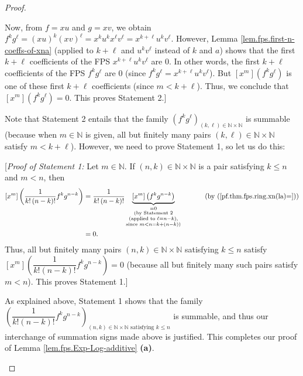 \begin{proof}
\begin{fineprint}
Now, from $f=xu$ and $g=xv$, we obtain $f^{k}g^{\ell}=\left(  xu\right)
^{k}\left(  xv\right)  ^{\ell}=x^{k}u^{k}x^{\ell}v^{\ell}=x^{k+\ell}%
u^{k}v^{\ell}$. However, Lemma \ref{lem.fps.first-n-coeffs-of-xna} (applied to
$k+\ell$ and $u^{k}v^{\ell}$ instead of $k$ and $a$) shows that the first
$k+\ell$ coefficients of the FPS $x^{k+\ell}u^{k}v^{\ell}$ are $0$. In other
words, the first $k+\ell$ coefficients of the FPS $f^{k}g^{\ell}$ are $0$
(since $f^{k}g^{\ell}=x^{k+\ell}u^{k}v^{\ell}$). But $\left[  x^{m}\right]
\left(  f^{k}g^{\ell}\right)  $ is one of these first $k+\ell$ coefficients
(since $m<k+\ell$). Thus, we conclude that $\left[  x^{m}\right]  \left(
f^{k}g^{\ell}\right)  =0$. This proves Statement 2.]

Note that Statement 2 entails that the family $\left(  f^{k}g^{\ell}\right)
_{\left(  k,\ell\right)  \in\mathbb{N}\times\mathbb{N}}$ is summable (because
when $m\in\mathbb{N}$ is given, all but finitely many pairs $\left(
k,\ell\right)  \in\mathbb{N}\times\mathbb{N}$ satisfy $m<k+\ell$). However, we
need to prove Statement 1, so let us do this:

[\textit{Proof of Statement 1:} Let $m\in\mathbb{N}$. If $\left(  n,k\right)
\in\mathbb{N}\times\mathbb{N}$ is a pair satisfying $k\leq n$ and $m<n$, then
\begin{align*}
\left[  x^{m}\right]  \left(  \dfrac{1}{k!\left(  n-k\right)  !}f^{k}%
g^{n-k}\right)   &  =\dfrac{1}{k!\left(  n-k\right)  !}\underbrace{\left[
x^{m}\right]  \left(  f^{k}g^{n-k}\right)  }_{\substack{=0\\\text{(by
Statement 2}\\\text{(applied to }\ell=n-k\text{),}\\\text{since }m<n=k+\left(
n-k\right)  \text{)}}}\ \ \ \ \ \ \ \ \ \ \left(  \text{by
(\ref{pf.thm.fps.ring.xn(la)=})}\right) \\
&  =0.
\end{align*}
Thus, all but finitely many pairs $\left(  n,k\right)  \in\mathbb{N}%
\times\mathbb{N}$ satisfying $k\leq n$ satisfy \newline$\left[  x^{m}\right]
\left(  \dfrac{1}{k!\left(  n-k\right)  !}f^{k}g^{n-k}\right)  =0$ (because
all but finitely many such pairs satisfy $m<n$). This proves Statement 1.]

As explained above, Statement 1 shows that the family \newline$\left(
\dfrac{1}{k!\left(  n-k\right)  !}f^{k}g^{n-k}\right)  _{\left(  n,k\right)
\in\mathbb{N}\times\mathbb{N}\text{ satisfying }k\leq n}$ is summable, and
thus our interchange of summation signs made above is justified. This
completes our proof of Lemma \ref{lem.fps.Exp-Log-additive} \textbf{(a)}.
\end{fineprint}


\end{proof}
